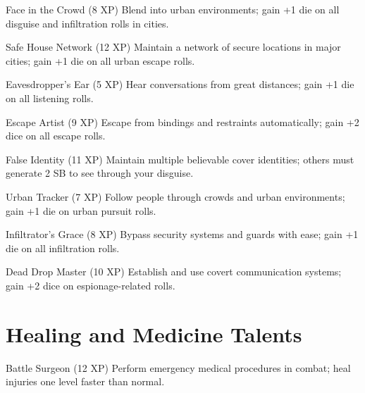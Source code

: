 \documentclass[11pt]{article}
\begin{document}
\begin{talentbox}{Face in the Crowd (8 XP)}
Blend into urban environments; gain +1 die on all disguise and infiltration rolls in cities.
\end{talentbox}

\begin{talentbox}{Safe House Network (12 XP)}
Maintain a network of secure locations in major cities; gain +1 die on all urban escape rolls.
\end{talentbox}

\begin{talentbox}{Eavesdropper's Ear (5 XP)}
Hear conversations from great distances; gain +1 die on all listening rolls.
\end{talentbox}

\begin{talentbox}{Escape Artist (9 XP)}
Escape from bindings and restraints automatically; gain +2 dice on all escape rolls.
\end{talentbox}

\begin{talentbox}{False Identity (11 XP)}
Maintain multiple believable cover identities; others must generate 2 SB to see through your disguise.
\end{talentbox}

\begin{talentbox}{Urban Tracker (7 XP)}
Follow people through crowds and urban environments; gain +1 die on urban pursuit rolls.
\end{talentbox}

\begin{talentbox}{Infiltrator's Grace (8 XP)}
Bypass security systems and guards with ease; gain +1 die on all infiltration rolls.
\end{talentbox}

\begin{talentbox}{Dead Drop Master (10 XP)}
Establish and use covert communication systems; gain +2 dice on espionage-related rolls.
\end{talentbox}

\section*{Healing and Medicine Talents}

\begin{talentbox}{Battle Surgeon (12 XP)}
Perform emergency medical procedures in combat; heal injuries one level faster than normal.
\end{talentbox}
\end{document}
